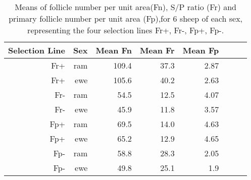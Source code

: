 \begin{table}[ht]
\centering
\caption{Means of follicle number per unit area(Fn), S/P ratio (Fr) and primary follicle number per unit area (Fp),for 6 sheep of each sex,  representing the four selection lines Fr+, Fr-, Fp+, Fp-.}
\vspace{0.1in}
\label{tab:meanskin}
\begin{tabular}{rrrrrrrr}
  \hline
  Selection Line & Sex & Mean Fn & Mean Fr & Mean Fp  \\ 
  \hline
   Fr+ & ram &  109.4 & 37.3 & 2.87  \\ 
   Fr+ & ewe & 105.6  & 40.2 & 2.63  \\ \hline
   Fr- & ram &  54.5 &  12.5 & 4.07  \\
   Fr- & ewe &  45.9 &  11.8 & 3.57  \\ \hline
   Fp+ & ram &  69.5 &  14.0 & 4.63  \\
   Fp+ & ewe  & 65.2 &  12.9 & 4.65  \\ \hline
   Fp- & ram  & 58.8 &  28.3 & 2.05  \\
   Fp- & ewe  & 49.8 & 25.1  & 1.9  \\ 
   \hline
\end{tabular}
\end{table}

